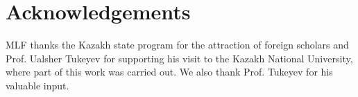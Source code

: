 \documentclass[11pt]{article}
\begin{document}
\section*{Acknowledgements}

MLF thanks the Kazakh state program for the attraction of foreign scholars and Prof. Ualsher Tukeyev for supporting his visit to the Kazakh National University, where part of this work was carried out. We also thank Prof. Tukeyev for his valuable input.




\end{document}
